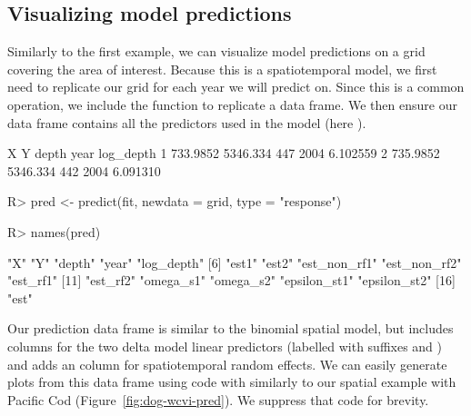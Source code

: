 \documentclass[article]{jss}\usepackage[]{graphicx}\usepackage[dvipsnames]{xcolor}
\newcommand{\fct}[1]{\code{#1()}}
\begin{document}
\subsection{Visualizing model predictions}

Similarly to the first example, we can visualize model predictions on a grid covering the area of interest.
Because this is a spatiotemporal model, we first need to replicate our grid for each year we will predict on.
Since this is a common operation, we include the function \fct{replicate\_df} to replicate a data frame.
We then ensure our data frame contains all the predictors used in the model (here ).

\begin{Schunk}
\begin{Soutput}
         X        Y depth year log_depth
1 733.9852 5346.334   447 2004  6.102559
2 735.9852 5346.334   442 2004  6.091310
\end{Soutput}
\end{Schunk}

\begin{Schunk}
\begin{Sinput}
R> pred <- predict(fit, newdata = grid, type = "response")
\end{Sinput}
\end{Schunk}

\begin{Schunk}
\begin{Sinput}
R> names(pred)
\end{Sinput}
\begin{Soutput}
 [1] "X"           "Y"           "depth"       "year"        "log_depth"
 [6] "est1"        "est2"        "est_non_rf1" "est_non_rf2" "est_rf1"
[11] "est_rf2"     "omega_s1"    "omega_s2"    "epsilon_st1" "epsilon_st2"
[16] "est"
\end{Soutput}
\end{Schunk}

Our prediction data frame is similar to the binomial spatial model, but includes columns for the two delta model linear predictors (labelled with suffixes  and ) and adds an  column for spatiotemporal random effects.
We can easily generate plots from this data frame using  code with \fct{geom\_raster} similarly to our spatial example with Pacific Cod (Figure~\ref{fig:dog-wcvi-pred}).
We suppress that code for brevity.
\end{document}
